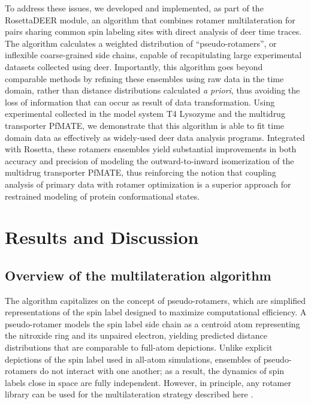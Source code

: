 To address these issues, we developed and implemented, as part of the RosettaDEER module, an algorithm that combines rotamer multilateration \citep*{Abdullin2021, Gaffney2012, Jeschke2018} for pairs sharing common spin labeling sites with direct analysis of \gls{deer} time traces. The algorithm calculates a weighted distribution of “pseudo-rotamers”, or inflexible coarse-grained side chains, capable of recapitulating large experimental datasets collected using \gls{deer}. Importantly, this algorithm goes beyond comparable methods by refining these ensembles using raw data in the time domain, rather than distance distributions calculated \emph{a priori}, thus avoiding the loss of information that can occur as result of data transformation. Using experimental collected in the model system T4 Lysozyme and the multidrug transporter PfMATE, we demonstrate that this algorithm is able to fit time domain data as effectively as widely-used \gls{deer} data analysis programs. Integrated with Rosetta, these rotamers ensembles yield substantial improvements in both accuracy and precision of modeling the outward-to-inward isomerization of the multidrug transporter PfMATE, thus reinforcing the notion that coupling analysis of primary data with rotamer optimization is a superior approach for restrained modeling of protein conformational states. 

\section{Results and Discussion}

\subsection{Overview of the multilateration algorithm}

The algorithm capitalizes on the concept of pseudo-rotamers, which are simplified representations of the spin label designed to maximize computational efficiency. A pseudo-rotamer models the spin label side chain as a centroid atom representing the nitroxide ring and its unpaired electron, yielding predicted distance distributions that are comparable to full-atom depictions. Unlike explicit depictions of the spin label used in all-atom simulations, ensembles of pseudo-rotamers do not interact with one another; as a result, the dynamics of spin labels close in space are fully independent. However, in principle, any rotamer library can be used for the multilateration strategy described here \citep*{Alexander2013, Fajer2015, Hagelueken2012, Hatmal2012, Polyhach2011, Spicher2020}.

